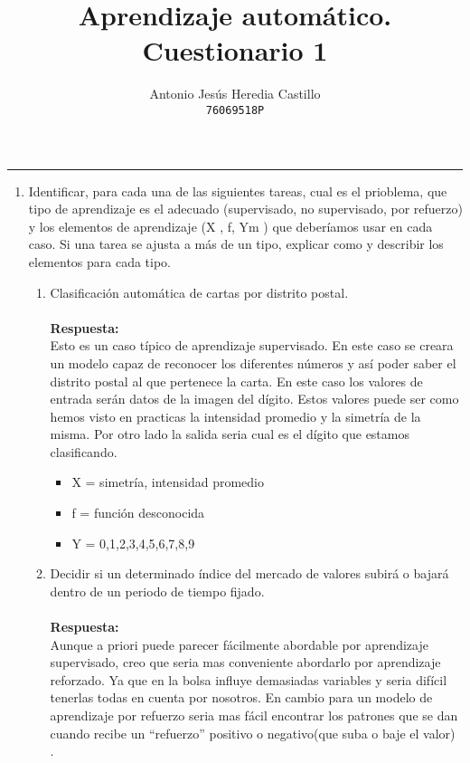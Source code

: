 \documentclass[12pt,a4paper]{article}
\newcommand{\horrule}[1]{\rule{\linewidth}{#1}} %
\begin{document}
\title{Aprendizaje autom\'atico. Cuestionario 1}

\author{
  Antonio Jesús Heredia Castillo\\
  \texttt{76069518P}
}

\date{}
\maketitle
\horrule{2pt}

\begin{enumerate}
	\item Identificar, para cada una de las siguientes tareas, cual es el prioblema, que tipo de	aprendizaje es el adecuado (supervisado, no supervisado, por refuerzo) y los elementos de aprendizaje (X , f, Ym ) que deberíamos usar en cada caso. Si una tarea se ajusta a más de un tipo, explicar como y describir los elementos para cada tipo.
	\begin{enumerate}
		\item  Clasificación automática de cartas por distrito postal.\\\\
		\textbf{Respuesta:}\\
		Esto es un caso típico de aprendizaje supervisado. En este caso se creara un modelo capaz de reconocer los diferentes números y así poder saber el distrito postal al que pertenece la carta. En este caso los valores de entrada serán datos de la imagen del dígito. Estos valores puede ser como hemos visto en practicas la intensidad promedio y la simetría de la misma. Por otro lado la salida seria cual es el dígito que estamos clasificando. 
		 \begin{itemize}
		 	\item X = {simetría, intensidad promedio}
		 	\item f = función desconocida
		 	\item Y = {0,1,2,3,4,5,6,7,8,9}
		 \end{itemize}
		\item Decidir si un determinado índice del mercado de valores subirá o bajará dentro de un periodo de tiempo fijado. \\\\
		\textbf{Respuesta:}\\
		Aunque a priori puede parecer fácilmente abordable por aprendizaje supervisado, creo que seria mas conveniente abordarlo por aprendizaje reforzado. Ya que en la bolsa influye demasiadas variables y seria difícil tenerlas todas en cuenta por nosotros. En cambio para un modelo de aprendizaje por refuerzo seria mas fácil encontrar los patrones que se dan cuando recibe un ``refuerzo'' positivo o negativo(que suba o baje el valor) .


\end{enumerate}
\end{enumerate}
\end{document}
